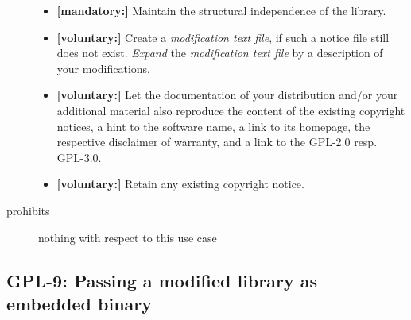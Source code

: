 \begin{description}
\begin{itemize}
  \item \textbf{[mandatory:]}  Maintain the structural independence of the
  library.
   

     
  \item \textbf{[voluntary:]} Create a \emph{modification text file}, if such a
  notice file still does not exist. \emph{Expand} the \emph{modification text
  file} by a description of your modifications.
  
  \item \textbf{[voluntary:]} Let the documentation of your distribution and/or
  your additional material also reproduce the content of the existing
  copyright notices, a hint to the software name, a link to its homepage,
  the respective disclaimer of warranty, and a link to the GPL-2.0 resp.
  GPL-3.0.
 
  \item \textbf{[voluntary:]} Retain any existing copyright notice. 
  
\end{itemize}

\item[prohibits] nothing with respect to this use case

\end{description}


\subsection{GPL-9: Passing a modified library as embedded binary}

